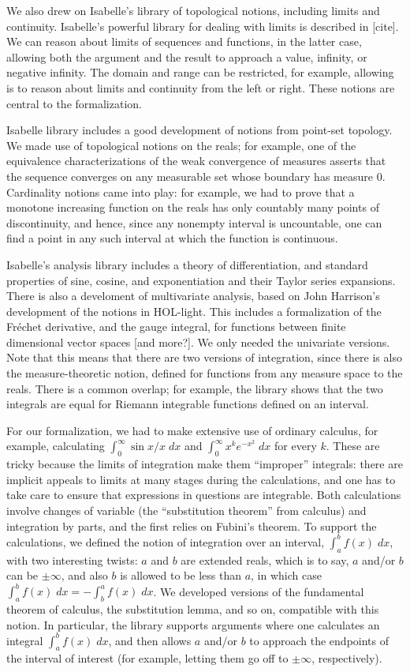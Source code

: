 \documentclass{article}
\begin{document}
We also drew on Isabelle's library of topological notions, including limits and continuity. Isabelle's powerful library for dealing with limits is described in [cite]. We can reason about limits of sequences and functions, in the latter case, allowing both the argument and the result to approach a value, infinity, or negative infinity. The domain and range can be restricted, for example, allowing is to reason about limits and continuity from the left or right. These notions are central to the formalization.

Isabelle library includes a good development of notions from point-set topology. We made use of topological notions on the reals; for example, one of the equivalence characterizations of the weak convergence of measures asserts that the sequence converges on any measurable set whose boundary has measure $0$. Cardinality notions came into play: for example, we had to prove that a monotone increasing function on the reals has only countably many points of discontinuity, and hence, since any nonempty interval is uncountable, one can find a point in any such interval at which the function is continuous. 

Isabelle's analysis library includes a theory of differentiation, and standard properties of sine, cosine, and exponentiation and their Taylor series expansions. There is also a develoment of multivariate analysis, based on John Harrison's development of the notions in HOL-light. This includes a formalization of the Fr\'echet derivative, and the gauge integral, for functions between finite dimensional vector spaces [and more?]. We only needed the univariate versions. Note that this means that there are two versions of integration, since there is also the measure-theoretic notion, defined for functions from any measure space to the reals. There is a common overlap; for example, the library shows that the two integrals are equal for Riemann integrable functions defined on an interval.

For our formalization, we had to make extensive use of ordinary calculus, for example, calculating $\int_0^\infty \sin x / x \; dx$ and $\int_0^\infty x^k e^{-x^2} \; dx$ for every $k$. These are tricky because the limits of integration make them ``improper'' integrals: there are implicit appeals to limits at many stages during the calculations, and one has to take care to ensure that expressions in questions are integrable. Both calculations involve changes of variable (the ``substitution theorem'' from calculus) and integration by parts, and the first relies on Fubini's theorem. To support the calculations, we defined the notion of integration over an interval, $\int_a^b f(x) \; dx$, with two interesting twists: $a$ and $b$ are extended reals, which is to say, $a$ and/or $b$ can be $\pm \infty$, and also $b$ is allowed to be less than $a$, in which case $\int_a^b f(x) \; dx = - \int_b^a f(x) \; dx$. We developed versions of the fundamental theorem of calculus, the substitution lemma, and so on, compatible with this notion. In particular, the library supports arguments where one calculates an integral $\int_a^b f(x) \; dx$, and then allows $a$ and/or $b$ to approach the endpoints of the interval of interest (for example, letting them go off to $\pm \infty$, respectively).
\end{document}

